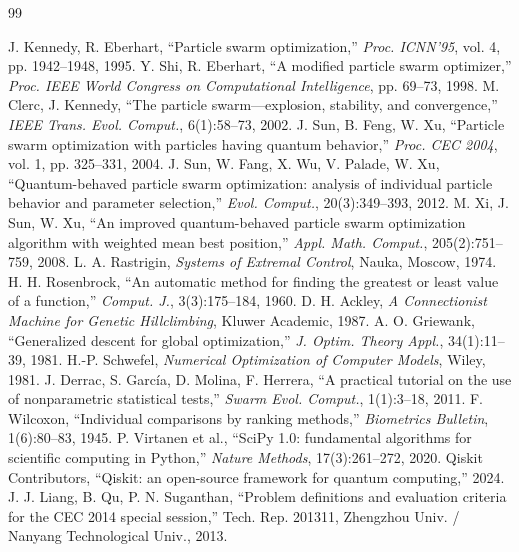\documentclass[11pt]{article}
\begin{document}
\vspace{-1.2em}
{\footnotesize
\begin{thebibliography}{99}
\setlength{\itemsep}{0pt}

 J. Kennedy, R. Eberhart, ``Particle swarm optimization,'' \emph{Proc. ICNN'95}, vol. 4, pp. 1942--1948, 1995.
 Y. Shi, R. Eberhart, ``A modified particle swarm optimizer,'' \emph{Proc. IEEE World Congress on Computational Intelligence}, pp. 69--73, 1998.
 M. Clerc, J. Kennedy, ``The particle swarm---explosion, stability, and convergence,'' \emph{IEEE Trans. Evol. Comput.}, 6(1):58--73, 2002.
 J. Sun, B. Feng, W. Xu, ``Particle swarm optimization with particles having quantum behavior,'' \emph{Proc. CEC 2004}, vol. 1, pp. 325--331, 2004.
 J. Sun, W. Fang, X. Wu, V. Palade, W. Xu, ``Quantum-behaved particle swarm optimization: analysis of individual particle behavior and parameter selection,'' \emph{Evol. Comput.}, 20(3):349--393, 2012.
 M. Xi, J. Sun, W. Xu, ``An improved quantum-behaved particle swarm optimization algorithm with weighted mean best position,'' \emph{Appl. Math. Comput.}, 205(2):751--759, 2008.
 L. A. Rastrigin, \emph{Systems of Extremal Control}, Nauka, Moscow, 1974.
 H. H. Rosenbrock, ``An automatic method for finding the greatest or least value of a function,'' \emph{Comput. J.}, 3(3):175--184, 1960.
 D. H. Ackley, \emph{A Connectionist Machine for Genetic Hillclimbing}, Kluwer Academic, 1987.
 A. O. Griewank, ``Generalized descent for global optimization,'' \emph{J. Optim. Theory Appl.}, 34(1):11--39, 1981.
 H.-P. Schwefel, \emph{Numerical Optimization of Computer Models}, Wiley, 1981.
 J. Derrac, S. Garc\'ia, D. Molina, F. Herrera, ``A practical tutorial on the use of nonparametric statistical tests,'' \emph{Swarm Evol. Comput.}, 1(1):3--18, 2011.
 F. Wilcoxon, ``Individual comparisons by ranking methods,'' \emph{Biometrics Bulletin}, 1(6):80--83, 1945.
 P. Virtanen et al., ``SciPy 1.0: fundamental algorithms for scientific computing in Python,'' \emph{Nature Methods}, 17(3):261--272, 2020.
 Qiskit Contributors, ``Qiskit: an open-source framework for quantum computing,'' 2024.
 J. J. Liang, B. Qu, P. N. Suganthan, ``Problem definitions and evaluation criteria for the CEC 2014 special session,'' Tech. Rep. 201311, Zhengzhou Univ. / Nanyang Technological Univ., 2013.

\end{thebibliography}
}
\end{document}
